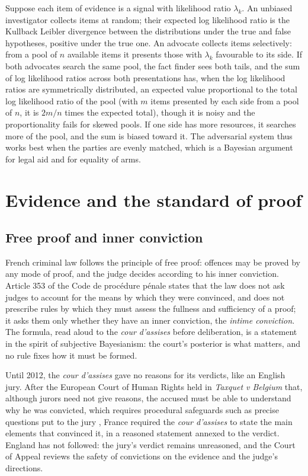 Suppose each item of evidence is a signal with likelihood ratio $\lambda_k$. An unbiased investigator collects items at random; their expected log likelihood ratio is the Kullback Leibler divergence between the distributions under the true and false hypotheses, positive under the true one. An advocate collects items selectively: from a pool of $n$ available items it presents those with $\lambda_k$ favourable to its side. If both advocates search the same pool, the fact finder sees both tails, and the sum of log likelihood ratios across both presentations has, when the log likelihood ratios are symmetrically distributed, an expected value proportional to the total log likelihood ratio of the pool (with $m$ items presented by each side from a pool of $n$, it is $2m/n$ times the expected total), though it is noisy and the proportionality fails for skewed pools. If one side has more resources, it searches more of the pool, and the sum is biased toward it. The adversarial system thus works best when the parties are evenly matched, which is a Bayesian argument for legal aid and for equality of arms.

\section{Evidence and the standard of proof}

\subsection{Free proof and inner conviction}

French criminal law follows the principle of free proof: offences may be proved by any mode of proof, and the judge decides according to his inner conviction. Article 353 of the Code de proc\'edure p\'enale states that the law does not ask judges to account for the means by which they were convinced, and does not prescribe rules by which they must assess the fullness and sufficiency of a proof; it asks them only whether they have an inner conviction, the \emph{intime conviction}. The formula, read aloud to the \emph{cour d'assises} before deliberation, is a statement in the spirit of subjective Bayesianism: the court's posterior is what matters, and no rule fixes how it must be formed.

Until 2012, the \emph{cour d'assises} gave no reasons for its verdicts, like an English jury. After the European Court of Human Rights held in \emph{Taxquet v Belgium} that, although jurors need not give reasons, the accused must be able to understand why he was convicted, which requires procedural safeguards such as precise questions put to the jury \citep{taxquet2010}, France required the \emph{cour d'assises} to state the main elements that convinced it, in a reasoned statement annexed to the verdict. England has not followed: the jury's verdict remains unreasoned, and the Court of Appeal reviews the safety of convictions on the evidence and the judge's directions.

